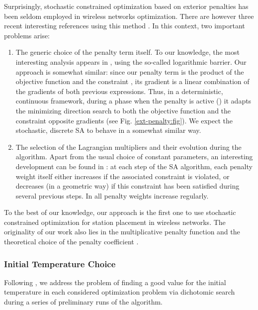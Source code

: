\documentclass[draftcls,onecolumn]{IEEEtran}
\theoremstyle{plain}
\theoremstyle{definition}
\begin{document}
Surprisingly, stochastic constrained optimization based on exterior penalties has been seldom employed in wireless networks optimization. There are however three recent interesting references using this method \cite{Yang11, Saifullah14, Azim12}. In this context, two important problems arise:
\begin{enumerate}
	\item The generic choice of the penalty term itself. To our knowledge, the most interesting analysis appears in \cite{Azim12}, using the so-called logarithmic barrier. Our approach is somewhat similar: since our penalty term is the product of the objective function  and the constraint , its gradient is a linear combination of the gradients of both previous expressions. Thus, in a deterministic, continuous framework, during a phase when the penalty is active () it adapts the minimizing direction search to both the objective function and the constraint  opposite gradients (see Fig. \ref{ext-penalty:fig}). We expect the stochastic, discrete SA to behave in a somewhat similar way.
	\item The selection  of the Lagrangian multipliers and their evolution during the algorithm. Apart from the usual choice of constant parameters, an interesting development can be found in \cite{Yang11}: at each step of the SA algorithm, each penalty weight itself either increases if the associated constraint is violated, or decreases (in a geometric way) if this constraint has been satisfied during several previous steps. In \cite{Saifullah14} all penalty weights increase regularly.\end{enumerate}

To the best of our knowledge, our approach is the first one to use stochastic constrained optimization for station placement in wireless networks. The originality of our work also lies in the multiplicative penalty function and the theoretical choice of the penalty coefficient . 





\subsubsection{Initial Temperature Choice} 
Following \cite{relplac}, we address the problem of finding a good value for the initial temperature  in each considered optimization problem via dichotomic search during a series of preliminary runs of the algorithm.   

%
 
\end{document}
